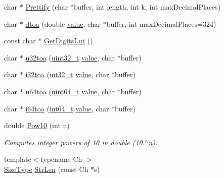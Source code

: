 \begin{DoxyCompactItemize}
\item 
char $\ast$ \mbox{\hyperlink{namespacerapidjson_1_1internal_a7865c7734bca9cbbf66bdc7c0d164a77}{Prettify}} (char $\ast$buffer, int length, int k, int max\+Decimal\+Places)
\item 
char $\ast$ \mbox{\hyperlink{namespacerapidjson_1_1internal_a51f3497ab9a7f691e06329409d6b5191}{dtoa}} (double \mbox{\hyperlink{namespacerapidjson_a1a75d60792094d496b500c40776030dd}{value}}, char $\ast$buffer, int max\+Decimal\+Places=324)
\item 
const char $\ast$ \mbox{\hyperlink{namespacerapidjson_1_1internal_a2220f7bb22e11be3bc6f20291659c545}{Get\+Digits\+Lut}} ()
\item 
char $\ast$ \mbox{\hyperlink{namespacerapidjson_1_1internal_ad5e42102d2ac70a691b3fdfdd2238e70}{u32toa}} (\mbox{\hyperlink{stdint_8h_a435d1572bf3f880d55459d9805097f62}{uint32\+\_\+t}} \mbox{\hyperlink{namespacerapidjson_a1a75d60792094d496b500c40776030dd}{value}}, char $\ast$buffer)
\item 
char $\ast$ \mbox{\hyperlink{namespacerapidjson_1_1internal_af2da6e17b77cf999be3b84d06e652d14}{i32toa}} (\mbox{\hyperlink{stdint_8h_ab1967d8591af1a4e48c37fd2b0f184d0}{int32\+\_\+t}} \mbox{\hyperlink{namespacerapidjson_a1a75d60792094d496b500c40776030dd}{value}}, char $\ast$buffer)
\item 
char $\ast$ \mbox{\hyperlink{namespacerapidjson_1_1internal_af565c1edf212e5e41b8a51c3973e38cb}{u64toa}} (\mbox{\hyperlink{stdint_8h_aec6fcb673ff035718c238c8c9d544c47}{uint64\+\_\+t}} \mbox{\hyperlink{namespacerapidjson_a1a75d60792094d496b500c40776030dd}{value}}, char $\ast$buffer)
\item 
char $\ast$ \mbox{\hyperlink{namespacerapidjson_1_1internal_a676fae3f0a9bc9a5e7646e31097a6f34}{i64toa}} (\mbox{\hyperlink{stdint_8h_a414156feea104f8f75b4ed9e3121b2f6}{int64\+\_\+t}} \mbox{\hyperlink{namespacerapidjson_a1a75d60792094d496b500c40776030dd}{value}}, char $\ast$buffer)
\item 
double \mbox{\hyperlink{namespacerapidjson_1_1internal_aba2871b1440237f69acb5ae602407bf9}{Pow10}} (int n)
\begin{DoxyCompactList}\small\item\em Computes integer powers of 10 in double (10.$^\wedge$n). \end{DoxyCompactList}\item 
{\footnotesize template$<$typename Ch $>$ }\\\mbox{\hyperlink{namespacerapidjson_a44eb33eaa523e36d466b1ced64b85c84}{Size\+Type}} \mbox{\hyperlink{namespacerapidjson_1_1internal_abe45d9242ecab3b9b58117961f57dc2f}{Str\+Len}} (const Ch $\ast$s)

\end{DoxyCompactItemize}
